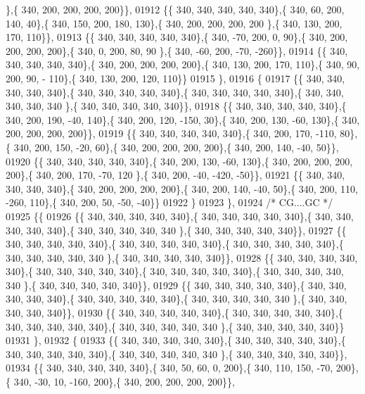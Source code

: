 \begin{DoxyCode}
      \},\{ 340, 200, 200, 200, 200\}\},
01912 \{\{ 340, 340, 340, 340, 340\},\{ 340,  60, 200, 140,  40\},\{ 340, 150, 200, 180, 130\},\{ 340, 200, 200, 200, 200
      \},\{ 340, 130, 200, 170, 110\}\},
01913 \{\{ 340, 340, 340, 340, 340\},\{ 340, -70, 200,   0,  90\},\{ 340, 200, 200, 200, 200\},\{ 340,   0, 200,  80,  90
      \},\{ 340, -60, 200, -70, -260\}\},
01914 \{\{ 340, 340, 340, 340, 340\},\{ 340, 200, 200, 200, 200\},\{ 340, 130, 200, 170, 110\},\{ 340,  90, 200,  90, -
      110\},\{ 340, 130, 200, 120, 110\}\}
01915 \},
01916 \{
01917 \{\{ 340, 340, 340, 340, 340\},\{ 340, 340, 340, 340, 340\},\{ 340, 340, 340, 340, 340\},\{ 340, 340, 340, 340, 340
      \},\{ 340, 340, 340, 340, 340\}\},
01918 \{\{ 340, 340, 340, 340, 340\},\{ 340, 200, 190, -40, 140\},\{ 340, 200, 120, -150,  30\},\{ 340, 200, 130, -60, 
      130\},\{ 340, 200, 200, 200, 200\}\},
01919 \{\{ 340, 340, 340, 340, 340\},\{ 340, 200, 170, -110,  80\},\{ 340, 200, 150, -20,  60\},\{ 340, 200, 200, 200, 
      200\},\{ 340, 200, 140, -40,  50\}\},
01920 \{\{ 340, 340, 340, 340, 340\},\{ 340, 200, 130, -60, 130\},\{ 340, 200, 200, 200, 200\},\{ 340, 200, 170, -70, 120
      \},\{ 340, 200, -40, -420, -50\}\},
01921 \{\{ 340, 340, 340, 340, 340\},\{ 340, 200, 200, 200, 200\},\{ 340, 200, 140, -40,  50\},\{ 340, 200, 110, -260, 
      110\},\{ 340, 200,  50, -50, -40\}\}
01922 \}
01923 \},
01924 \textcolor{comment}{/* CG....GC */}
01925 \{\{
01926 \{\{ 340, 340, 340, 340, 340\},\{ 340, 340, 340, 340, 340\},\{ 340, 340, 340, 340, 340\},\{ 340, 340, 340, 340, 340
      \},\{ 340, 340, 340, 340, 340\}\},
01927 \{\{ 340, 340, 340, 340, 340\},\{ 340, 340, 340, 340, 340\},\{ 340, 340, 340, 340, 340\},\{ 340, 340, 340, 340, 340
      \},\{ 340, 340, 340, 340, 340\}\},
01928 \{\{ 340, 340, 340, 340, 340\},\{ 340, 340, 340, 340, 340\},\{ 340, 340, 340, 340, 340\},\{ 340, 340, 340, 340, 340
      \},\{ 340, 340, 340, 340, 340\}\},
01929 \{\{ 340, 340, 340, 340, 340\},\{ 340, 340, 340, 340, 340\},\{ 340, 340, 340, 340, 340\},\{ 340, 340, 340, 340, 340
      \},\{ 340, 340, 340, 340, 340\}\},
01930 \{\{ 340, 340, 340, 340, 340\},\{ 340, 340, 340, 340, 340\},\{ 340, 340, 340, 340, 340\},\{ 340, 340, 340, 340, 340
      \},\{ 340, 340, 340, 340, 340\}\}
01931 \},
01932 \{
01933 \{\{ 340, 340, 340, 340, 340\},\{ 340, 340, 340, 340, 340\},\{ 340, 340, 340, 340, 340\},\{ 340, 340, 340, 340, 340
      \},\{ 340, 340, 340, 340, 340\}\},
01934 \{\{ 340, 340, 340, 340, 340\},\{ 340,  50,  60,   0, 200\},\{ 340, 110, 150, -70, 200\},\{ 340, -30,  10, -160, 
      200\},\{ 340, 200, 200, 200, 200\}\},

\end{DoxyCode}
